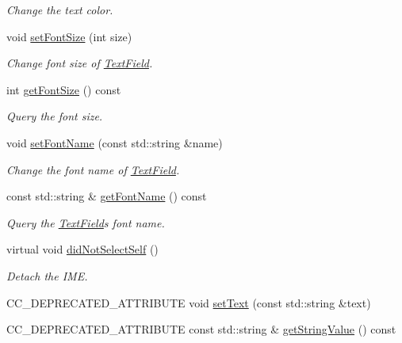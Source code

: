 \begin{DoxyCompactItemize}
\begin{DoxyCompactList}\small\item\em Change the text color. \end{DoxyCompactList}\item 
void \hyperlink{classui_1_1TextField_afeac699e913b7fad0d171745c98f0915}{set\+Font\+Size} (int size)
\begin{DoxyCompactList}\small\item\em Change font size of \hyperlink{classui_1_1TextField}{Text\+Field}. \end{DoxyCompactList}\item 
int \hyperlink{classui_1_1TextField_a92c02fd871c8c39af214b6796278f09e}{get\+Font\+Size} () const
\begin{DoxyCompactList}\small\item\em Query the font size. \end{DoxyCompactList}\item 
void \hyperlink{classui_1_1TextField_a0dc06b592621a2867e5e91cea01470db}{set\+Font\+Name} (const std\+::string \&name)
\begin{DoxyCompactList}\small\item\em Change the font name of \hyperlink{classui_1_1TextField}{Text\+Field}. \end{DoxyCompactList}\item 
const std\+::string \& \hyperlink{classui_1_1TextField_adbd8af21c42d4273d2cdd62acb4d5da4}{get\+Font\+Name} () const
\begin{DoxyCompactList}\small\item\em Query the \hyperlink{classui_1_1TextField}{Text\+Field}\textquotesingle{}s font name. \end{DoxyCompactList}\item 
\mbox{\label{classui_1_1TextField_ae9650e42bc4bfc39495411c612ebf0fb}} 
virtual void \hyperlink{classui_1_1TextField_ae9650e42bc4bfc39495411c612ebf0fb}{did\+Not\+Select\+Self} ()
\begin{DoxyCompactList}\small\item\em Detach the I\+ME. \end{DoxyCompactList}\item 
C\+C\+\_\+\+D\+E\+P\+R\+E\+C\+A\+T\+E\+D\+\_\+\+A\+T\+T\+R\+I\+B\+U\+TE void \hyperlink{classui_1_1TextField_adcd37c99947c549a77ffbd3389e176b3}{set\+Text} (const std\+::string \&text)
\item 
C\+C\+\_\+\+D\+E\+P\+R\+E\+C\+A\+T\+E\+D\+\_\+\+A\+T\+T\+R\+I\+B\+U\+TE const std\+::string \& \hyperlink{classui_1_1TextField_afc22b95a00cce564179260e456ad9ff3}{get\+String\+Value} () const

\end{DoxyCompactItemize}
